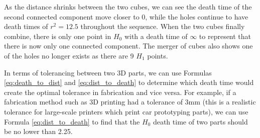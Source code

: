 \documentclass[ma]{uncgdissertationexp}
\theoremstyle{plain}
\theoremstyle{definition}
\theoremstyle{remark}
\begin{document}
\par As the distance shrinks between the two cubes, we can see the death time of the second connected component move closer to 0, while the holes continue to have death times of $r^{2} = 12.5$ throughout the sequence. When the two cubes finally combine, there is only one point in $H_{0}$ with a death time of $\infty$ to represent that there is now only one connected component. The merger of cubes also shows one of the holes no longer exists as there are 9 $H_{1}$ points.
\par In terms of tolerancing between two 3D parts, we can use Formulas \ref{eq:death_to_dist} and \ref{eq:dist_to_death} to determine which death time would create the optimal tolerance in fabrication and vice versa. For example, if a fabrication method such as 3D printing had a tolerance of 3mm (this is a realistic tolerance for large-scale printers which print car prototyping parts), we can use Formula \ref{eq:dist_to_death} to find that the $H_{0}$ death time of two parts should be no lower than 2.25.
\newpage
\end{document}
